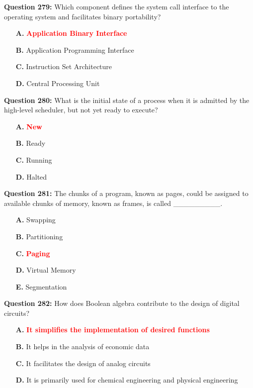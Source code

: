 \documentclass[12pt,a4paper]{article}
\begin{document}
\textbf{Question 279:} Which component defines the system call interface to the operating system and facilitates binary portability?

\begin{itemize}
    \item[\textbf{A.}] \textcolor{red}{\textbf{Application Binary Interface}}
    \item[\textbf{B.}] Application Programming Interface
    \item[\textbf{C.}] Instruction Set Architecture
    \item[\textbf{D.}] Central Processing Unit
\end{itemize}

\vspace{0.5cm}

\textbf{Question 280:} What is the initial state of a process when it is admitted by the high-level scheduler, but not yet ready to execute?

\begin{itemize}
    \item[\textbf{A.}] \textcolor{red}{\textbf{New}}
    \item[\textbf{B.}] Ready
    \item[\textbf{C.}] Running
    \item[\textbf{D.}] Halted
\end{itemize}

\vspace{0.5cm}

\textbf{Question 281:} The chunks of a program, known as pages, could be assigned to available chunks of memory, known as frames, is called _________.

\begin{itemize}
    \item[\textbf{A.}] Swapping
    \item[\textbf{B.}] Partitioning
    \item[\textbf{C.}] \textcolor{red}{\textbf{Paging}}
    \item[\textbf{D.}] Virtual Memory
    \item[\textbf{E.}] Segmentation
\end{itemize}

\vspace{0.5cm}

\textbf{Question 282:} How does Boolean algebra contribute to the design of digital circuits?

\begin{itemize}
    \item[\textbf{A.}] \textcolor{red}{\textbf{It simplifies the implementation of desired functions}}
    \item[\textbf{B.}] It helps in the analysis of economic data
    \item[\textbf{C.}] It facilitates the design of analog circuits
    \item[\textbf{D.}] It is primarily used for chemical engineering and physical engineering
\end{itemize}
\end{document}

